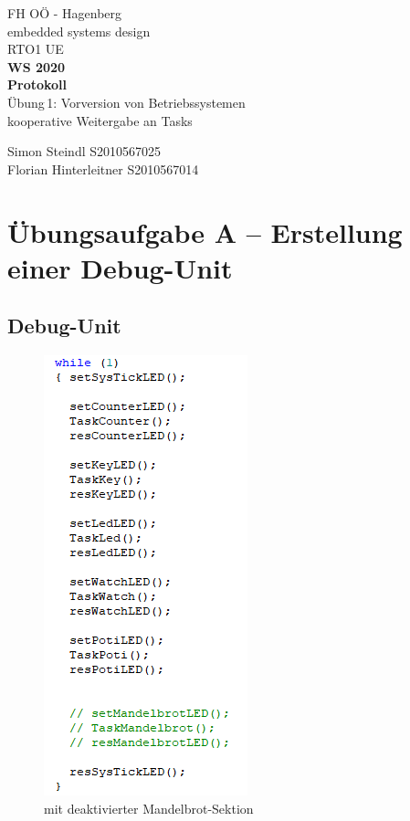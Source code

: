 \documentclass{article}
\begin{document}
\begin{titlepage}
	\begin{center}
		{\large{FH OÖ - Hagenberg \\ embedded systems design}\\\vspace*{4cm}}
		\small{RTO1 UE}\\
		\textbf{WS 2020}\\\vspace*{2cm}
		\Huge{\textbf{Protokoll}}\\\vspace*{1cm}
		\huge{Übung\,1: Vorversion von Betriebssystemen\\ \large{kooperative Weitergabe an Tasks } } \vspace*{90mm}
		
		\small{Simon Steindl  S2010567025	\\
		Florian Hinterleitner S2010567014	\\
		}
	\end{center}
\end{titlepage}

 
\section{Übungsaufgabe A – Erstellung einer Debug-Unit}

\subsection{Debug-Unit}
	\begin{figure}[h!]
		\begin{center}
			\includegraphics{debugUnit}
			\caption{mit deaktivierter Mandelbrot-Sektion}
		\end{center}
	\end{figure}
\end{document}
